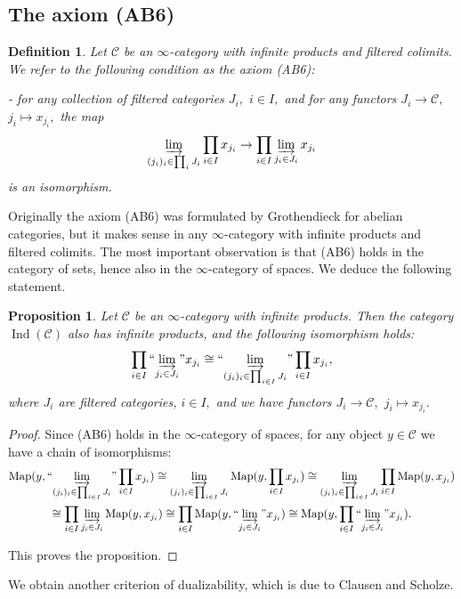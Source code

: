 \documentclass[11pt,leqno]{amsart}
\newtheorem{defi}[theo]{Definition}
\newtheorem{prop}[theo]{Proposition}
\numberwithin{equation}{section}
\def\Map{\operatorname{Map}}
\newcommand{\indlim}[1][]{\mathop{\varinjlim}\limits_{#1}}
\newcommand{\inddlim}[1][]{{``{\indlim[#1]}"}}
\newcommand{\cC}{{\mathcal C}}
\newcommand{\Ind}{\operatorname{Ind}}
\begin{document}
\subsection{The axiom (AB6)}
\label{ssec:AB6}

\begin{defi}Let $\cC$ be an $\infty$-category with infinite products and filtered colimits. We refer to the following condition as the axiom (AB6): 

- for any collection of filtered categories $J_i,$ $i\in I,$ and for any functors $J_i\to \cC,$ $j_i\mapsto x_{j_i},$ the map $$\indlim[(j_i)_i\in\prod_i J_i]\prod_{i\in I} x_{j_i}\to \prod_{i\in I}\indlim[j_i\in J_i]x_{j_i}$$ is an isomorphism.\end{defi}

Originally the axiom (AB6) was formulated by Grothendieck \cite{Gro} for abelian categories, but it makes sense in any $\infty$-category with infinite products and filtered colimits. The most important observation is that (AB6) holds in the category of sets, hence also in the $\infty$-category of spaces. We deduce the following statement.

\begin{prop}\label{prop:products_in_Ind_C} Let $\cC$ be an $\infty$-category with infinite products. Then the category $\Ind(\cC)$ also has infinite products, and the following isomorphism holds:
$$\prod_{i\in I}\inddlim[j_i\in J_i]x_{j_i}\cong \inddlim[(j_i)_i\in\prod_{i\in I}J_i]\prod_{i\in I}x_{j_i},$$ where $J_i$ are filtered categories, 
$i\in I,$ and we have functors $J_i\to \cC,$ $j_i\mapsto x_{j_i}.$\end{prop}

\begin{proof}Since (AB6) holds in the $\infty$-category of spaces, for any object $y\in\cC$ we have a chain of isomorphisms:
\begin{multline*}\Map(y,\inddlim[(j_i)_i\in\prod_{i\in I}J_i]\prod_{i\in I}x_{j_i})\cong \indlim[(j_i)_i\in\prod_{i\in I}J_i]\Map(y,\prod_{i\in I}x_{j_i})
\cong \indlim[(j_i)_i\in\prod_{i\in I}J_i]\prod_{i\in I}\Map(y,x_{j_i})\\
\cong \prod_{i\in I}\indlim[j_i\in J_i]\Map(y,x_{j_i})\cong \prod_{i\in I}\Map(y,\inddlim[j_i\in J_i]x_{j_i})\cong \Map(y,\prod_{i\in I}\inddlim[j_i\in J_i]x_{j_i}).\end{multline*}

This proves the proposition.\end{proof}

We obtain another criterion of dualizability, which is due to Clausen and Scholze.
\end{document}
